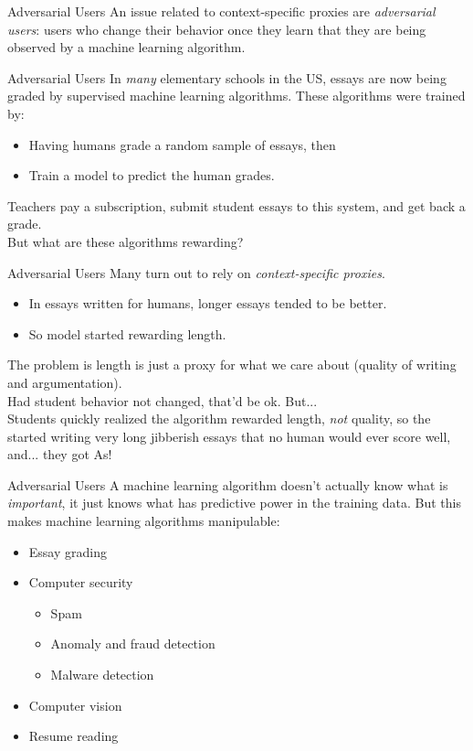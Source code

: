 \documentclass[11pt]{beamer}
\begin{document}
\begin{frame}[c]{Adversarial Users}
  An issue related to context-specific proxies are \emph{adversarial users}: users who change their behavior once they learn that they are being observed by a machine learning algorithm.
\end{frame}

\begin{frame}[c]{Adversarial Users}
In \emph{many} elementary schools in the US, essays are now being graded by supervised machine learning algorithms.
These algorithms were trained by:
\begin{itemize}
  \item Having humans grade a random sample of essays, then
  \item Train a model to predict the human grades.
\end{itemize}
\pause Teachers pay a subscription, submit student essays to this system, and get back a grade. \\
\pause But what are these algorithms rewarding?
\end{frame}

\begin{frame}[c]{Adversarial Users}
  Many turn out to rely on \emph{context-specific proxies}.
  \begin{itemize}
    \item In essays written for humans, longer essays tended to be better.
    \item So model started rewarding length.
  \end{itemize}
  \pause The problem is length is just a \alert{proxy} for what we care about (quality of writing and argumentation).\\
  \pause Had student behavior not changed, that'd be ok. But... \\
  \vspace{0.1cm}
  Students quickly realized the algorithm rewarded length, \emph{not} quality, so the started writing very long jibberish essays that no human would ever score well, and... they got As!
\end{frame}

\begin{frame}[c]{Adversarial Users}
A machine learning algorithm doesn't actually know what is \emph{important}, it just knows what has predictive power in the training data. But this makes machine learning algorithms manipulable:
\begin{itemize}
  \item Essay grading
  \item Computer security \\
  \begin{itemize}
    \item Spam
    \item Anomaly and fraud detection
    \item Malware detection
  \end{itemize}
  \item Computer vision
  \item Resume reading
\end{itemize}
\end{frame}
\end{document}
